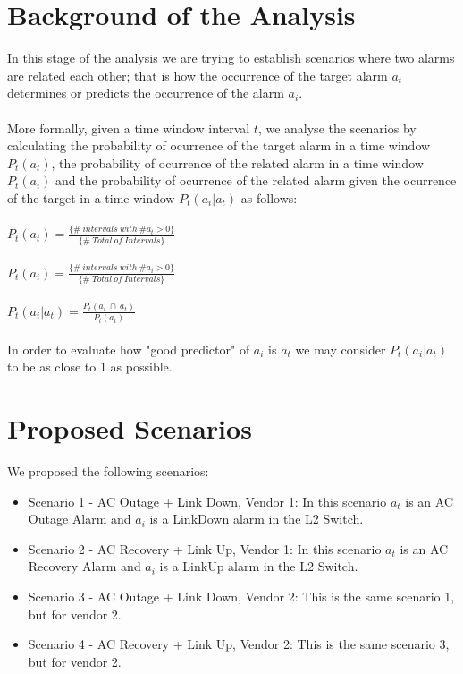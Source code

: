 \documentclass[10pt,a4paper]{article}
\begin{document}
 \section{Background of the Analysis}
In this stage of the analysis we are trying to establish scenarios where two alarms are related each other; that is how the occurrence of the target alarm $a_t$ determines or predicts the occurrence of the alarm $a_i$.
\\\\
More formally, given a time window interval $t$, we analyse the scenarios by calculating the probability of ocurrence of the target alarm in a time window $P_t(a_t)$, the probability of ocurrence of the related alarm in a time window $P_t(a_i)$ and the probability of ocurrence of the related alarm given the ocurrence of the target in a time window $P_t(a_i|a_t)$ as follows:
\\\\
$P_t(a_t) = \frac{\{\#\ intervals\ with\ \#a_t > 0 \}}{\{\#\ Total\ of\ Intervals\}}$
\\\\
$P_t(a_i) = \frac{\{\#\ intervals\ with\ \#a_i > 0 \}}{\{\#\ Total\ of\ Intervals\}}$ 
\\\\
$P_t(a_i|a_t) = \frac{P_t(a_i\ \cap\ a_t)}{P_t(a_t)}$
\\\\
In order to evaluate how "good predictor" of $a_i$ is $a_t$ we may consider $P_t(a_i|a_t)$ to be as close to 1 as possible.

 \section{Proposed Scenarios}
We proposed the following scenarios:

\begin{itemize}
\item Scenario 1 - AC Outage + Link Down, Vendor 1: In this scenario $a_t$ is an AC Outage Alarm and $a_i$ is a LinkDown alarm in the L2 Switch.
\item Scenario 2 - AC Recovery + Link Up, Vendor 1: In this scenario $a_t$ is an AC Recovery Alarm and $a_i$ is a LinkUp alarm in the L2 Switch.
\item Scenario 3 - AC Outage + Link Down, Vendor 2: This is the same scenario 1, but for vendor 2.
\item Scenario 4 - AC Recovery + Link Up, Vendor 2: This is the same scenario 3, but for vendor 2.
\end{itemize}
\end{document}
